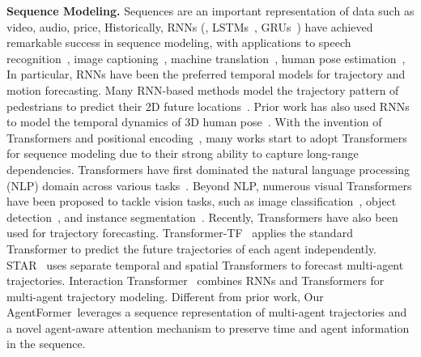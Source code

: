 \documentclass[10pt,twocolumn,letterpaper]{article}
\newcommand{\mname}{AgentFormer}
\begin{document}
\noindent\textbf{Sequence Modeling.} Sequences are an important representation of data such as video, audio, price, \etc Historically, RNNs (\eg, LSTMs~\cite{hochreiter1997long}, GRUs~\cite{chung2014empirical}) have achieved remarkable success in sequence modeling, with applications to speech recognition~\cite{xiong2018microsoft,miao2015eesen}, image captioning~\cite{xu2015show}, machine translation~\cite{luong2015effective}, human pose estimation~\cite{yuan20183d,kocabas2020vibe}, \etc In particular, RNNs have been the preferred temporal models for trajectory and motion forecasting. Many RNN-based methods model the trajectory pattern of pedestrians to predict their 2D future locations~\cite{alahi2016social,ivanovic2019trajectron,zhang2019sr}. Prior work has also used RNNs to model the temporal dynamics of 3D human pose~\cite{fragkiadaki2015recurrent,yuan2019ego,yuan2020residual}. With the invention of Transformers and positional encoding~\cite{vaswani2017attention}, many works start to adopt Transformers for sequence modeling due to their strong ability to capture long-range dependencies. Transformers have first dominated the natural language processing (NLP) domain across various tasks~\cite{devlin2018bert,lan2019albert,yang2019xlnet}. Beyond NLP, numerous visual Transformers have been proposed to tackle vision tasks, such as image classification~\cite{dosovitskiy2020image}, object detection~\cite{carion2020end}, and instance segmentation~\cite{wang2020end}. Recently, Transformers have also been used for trajectory forecasting. Transformer-TF~\cite{giuliari2020transformer} applies the standard Transformer to predict the future trajectories of each agent independently. STAR~\cite{yu2020spatio} uses separate temporal and spatial Transformers to forecast multi-agent trajectories. Interaction Transformer~\cite{li2020end} combines RNNs and Transformers for multi-agent trajectory modeling.
Different from prior work, Our \mname\ leverages a sequence representation of multi-agent trajectories and a novel agent-aware attention mechanism to preserve time and agent information in the sequence.
\end{document}
